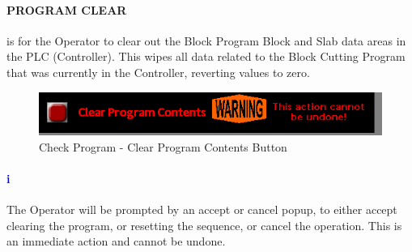 \paragraph{PROGRAM CLEAR}is for the Operator to clear out the Block Program Block and Slab data areas in the PLC (Controller). This wipes all data related to the Block Cutting Program that was currently in the Controller, reverting values to zero.
\begin{figure}
	\centering
	\includegraphics[width=.3\linewidth]{screen-captures/program/pgm_review1-clr-pgm}
	\caption{Check Program - Clear Program Contents Button}
	\label{fig:pgm-clr}
\end{figure}
\paragraph{\textbf{\LARGE \textcolor{blue}{i}}}The Operator will be prompted by an accept or cancel popup, to either accept clearing the program, or resetting the sequence, or cancel the operation. This is an immediate action and cannot be undone.